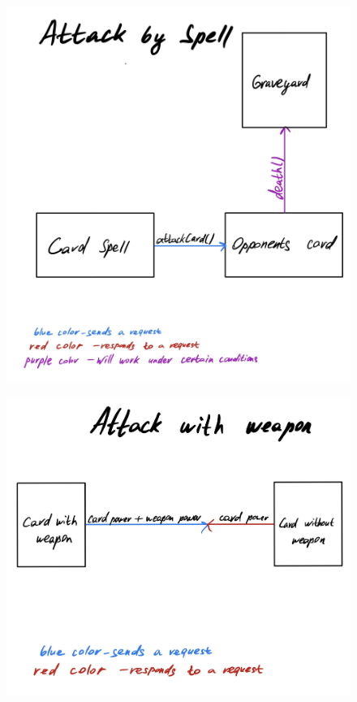 \documentclass[12pt]{article}
\begin{document}
\begin{figure}[h]
\centering 
\includegraphics[width=1\textwidth]{img/spell.jpg}
\end{figure}
\begin{figure}[h]
\centering 
\includegraphics[width=1\textwidth]{img/weapon.jpg}
\end{figure}
\end{document}
